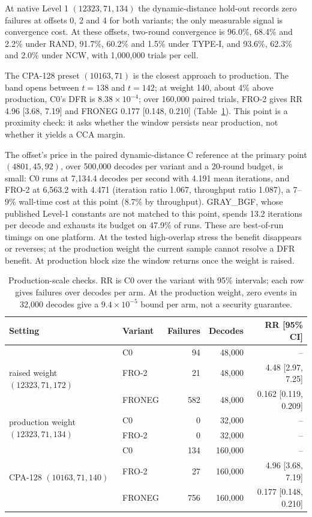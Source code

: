 \documentclass[lettersize,journal,onecolumn]{IEEEtran}
\begin{document}
At native Level 1 $(12323,71,134)$ the dynamic-distance hold-out records zero failures at offsets 0, 2 and 4 for both variants; the only measurable signal is convergence cost. At these offsets, two-round convergence is 96.0\%, 68.4\% and 2.2\% under RAND, 91.7\%, 60.2\% and 1.5\% under TYPE-I, and 93.6\%, 62.3\% and 2.0\% under NCW, with 1{,}000{,}000 trials per cell.

The CPA-128 preset $(10163,71)$ is the closest approach to production. The band opens between $t=138$ and $t=142$; at weight 140, about 4\% above production, C0's DFR is $8.38\times10^{-4}$; over 160{,}000 paired trials, FRO-2 gives RR 4.96 [3.68, 7.19] and FRONEG 0.177 [0.148, 0.210] (Table~\ref{tab:added}). This point is a proximity check: it asks whether the window persists near production, not whether it yields a CCA margin.

The offset's price in the paired dynamic-distance C reference at the primary point $(4801,45,92)$, over 500{,}000 decodes per variant and a 20-round budget, is small: C0 runs at 7{,}134.4 decodes per second with 4.191 mean iterations, and FRO-2 at 6{,}563.2 with 4.471 (iteration ratio 1.067, throughput ratio 1.087), a 7--9\% wall-time cost at this point (8.7\% by throughput). GRAY\_BGF, whose published Level-1 constants are not matched to this point, spends 13.2 iterations per decode and exhausts its budget on 47.9\% of runs. These are best-of-run timings on one platform. At the tested high-overlap stress the benefit disappears or reverses; at the production weight the current sample cannot resolve a DFR benefit. At production block size the window returns once the weight is raised.

\begin{table}[!t]
\centering
\small
\caption{Production-scale checks. RR is C0 over the variant with 95\% intervals; each row gives failures over decodes per arm. At the production weight, zero events in 32{,}000 decodes give a $9.4\times10^{-5}$ bound per arm, not a security guarantee.}
\label{tab:added}
\begin{tabular}{llrrr}
\toprule
Setting & Variant & Failures & Decodes & RR [95\% CI] \\
\midrule
\multirow{3}{*}{raised weight $(12323,71,172)$} & C0 & 94 & 48{,}000 & -- \\
 & FRO-2 & 21 & 48{,}000 & 4.48 [2.97, 7.25] \\
 & FRONEG & 582 & 48{,}000 & 0.162 [0.119, 0.209] \\
\midrule
\multirow{2}{*}{production weight $(12323,71,134)$} & C0 & 0 & 32{,}000 & -- \\
 & FRO-2 & 0 & 32{,}000 & -- \\
\midrule
\multirow{3}{*}{CPA-128 $(10163,71,140)$} & C0 & 134 & 160{,}000 & -- \\
 & FRO-2 & 27 & 160{,}000 & 4.96 [3.68, 7.19] \\
 & FRONEG & 756 & 160{,}000 & 0.177 [0.148, 0.210] \\
\bottomrule
\end{tabular}
\end{table}
\end{document}
